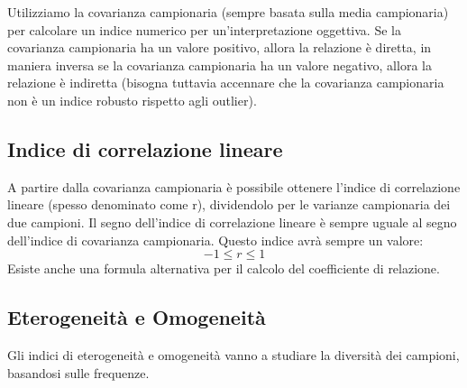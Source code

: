 Utilizziamo la covarianza campionaria (sempre basata sulla media campionaria) per calcolare un indice numerico per un'interpretazione oggettiva. Se la covarianza campionaria ha un valore positivo, allora la relazione è diretta, in maniera inversa se la covarianza campionaria ha un valore negativo, allora la relazione è indiretta (bisogna tuttavia accennare che la covarianza campionaria non è un indice robusto rispetto agli outlier).



\subsection{Indice di correlazione lineare}
A partire dalla covarianza campionaria è possibile ottenere l'indice di correlazione lineare (spesso denominato come r), dividendolo per le varianze campionaria dei due campioni. Il segno dell'indice di correlazione lineare è sempre uguale al segno dell'indice di covarianza campionaria. Questo indice avrà sempre un valore:
\begin{equation*}
		-1 \leq r \leq 1
	\end{equation*}
Esiste anche una formula alternativa per il calcolo del coefficiente di relazione. %

\subsection{Eterogeneità e Omogeneità}
Gli indici di eterogeneità e omogeneità vanno a studiare la diversità dei campioni, basandosi sulle frequenze.

